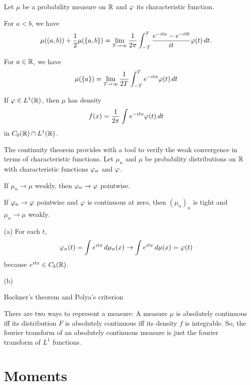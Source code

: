 \documentclass{../note}
\begin{document}
\begin{prb}
Let $\mu$ be a probability measure on $\mathbb{R}$ and $\varphi$ its characteristic function.
\begin{parts}
\item For $a<b$, we have
\[\mu((a,b))+\frac12\mu(\{a,b\})=\lim_{T\to\infty}\frac1{2\pi}\int_{-T}^T\frac{e^{-ita}-e^{-itb}}{it}\varphi(t)\,dt.\]
\item For $a\in\mathbb{R}$, we have
\[\mu(\{a\})=\lim_{T\to\infty}\frac1{2T}\int_{-T}^Te^{-ita}\varphi(t)\,dt\]
\item If $\varphi\in L^1(\mathbb{R})$, then $\mu$ has density
\[f(x)=\frac1{2\pi}\int e^{-itx}\varphi(t)\,dt\]
in $C_0(\mathbb{R})\cap L^1(\mathbb{R})$.
\end{parts}
\end{prb}

\begin{prb}
The continuity theorem provides with a tool to verify the weak convergence in terms of characteristic functions.
Let $\mu_n$ and $\mu$ be probability distributions on $\mathbb{R}$ with characteristic functions $\varphi_n$ and $\varphi$.
\begin{parts}
\item If $\mu_n\to\mu$ weakly, then $\varphi_n\to\varphi$ pointwise.
\item If $\varphi_n\to\varphi$ pointwise and $\varphi$ is continuous at zero, then $(\mu_n)_n$ is tight and $\mu_n\to\mu$ weakly.
\end{parts}
\end{prb}
\begin{pf}
(a)
For each $t$,
\[\varphi_n(t)=\int e^{itx}\,d\mu_n(x)\to\int e^{itx}\,d\mu(x)=\varphi(t)\]
because $e^{itx}\in C_b(\mathbb{R})$.

(b)


\end{pf}

\begin{prb}
Bochner's theorem and Polya's criterion
\end{prb}


There are two ways to represent a measure:
A measure $\mu$ is absolutely continuous iff its distribution $F$ is absolutely continuous iff its density $f$ is integrable.
So, the fourier transform of an absolutely continuous measure is just the fourier transform of $L^1$ functions.



\section{Moments}
\end{document}
